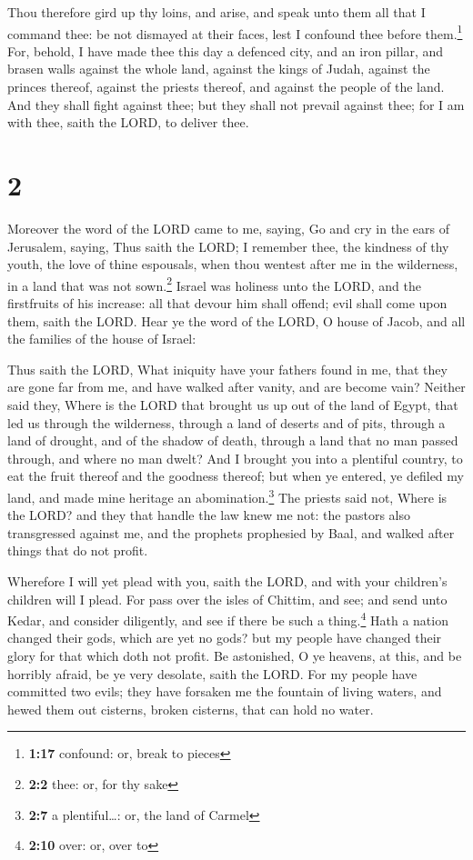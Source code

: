  Thou therefore gird up thy loins, and arise, and speak
unto them all that I command thee: be not dismayed at their faces, lest
I confound thee before them.\footnote{\textbf{1:17} confound: or, break
  to pieces}  For, behold, I have made thee this day a
defenced city, and an iron pillar, and brasen walls against the whole
land, against the kings of Judah, against the princes thereof, against
the priests thereof, and against the people of the land. 
And they shall fight against thee; but they shall not prevail against
thee; for I am with thee, saith the LORD, to deliver thee.

\hypertarget{section-1}{%
\section{2}\label{section-1}}

 Moreover the word of the LORD came to me, saying,
 Go and cry in the ears of Jerusalem, saying, Thus saith
the LORD; I remember thee, the kindness of thy youth, the love of thine
espousals, when thou wentest after me in the wilderness, in a land that
was not sown.\footnote{\textbf{2:2} thee: or, for thy sake}
 Israel was holiness unto the LORD, and the firstfruits of
his increase: all that devour him shall offend; evil shall come upon
them, saith the LORD.  Hear ye the word of the LORD, O
house of Jacob, and all the families of the house of Israel:

 Thus saith the LORD, What iniquity have your fathers
found in me, that they are gone far from me, and have walked after
vanity, and are become vain?  Neither said they, Where is
the LORD that brought us up out of the land of Egypt, that led us
through the wilderness, through a land of deserts and of pits, through a
land of drought, and of the shadow of death, through a land that no man
passed through, and where no man dwelt?  And I brought you
into a plentiful country, to eat the fruit thereof and the goodness
thereof; but when ye entered, ye defiled my land, and made mine heritage
an abomination.\footnote{\textbf{2:7} a plentiful\ldots: or, the land of
  Carmel}  The priests said not, Where is the LORD? and
they that handle the law knew me not: the pastors also transgressed
against me, and the prophets prophesied by Baal, and walked after things
that do not profit.

 Wherefore I will yet plead with you, saith the LORD, and
with your children's children will I plead.  For pass
over the isles of Chittim, and see; and send unto Kedar, and consider
diligently, and see if there be such a thing.\footnote{\textbf{2:10}
  over: or, over to}  Hath a nation changed their gods,
which are yet no gods? but my people have changed their glory for that
which doth not profit.  Be astonished, O ye heavens, at
this, and be horribly afraid, be ye very desolate, saith the LORD.
 For my people have committed two evils; they have
forsaken me the fountain of living waters, and hewed them out cisterns,
broken cisterns, that can hold no water.

